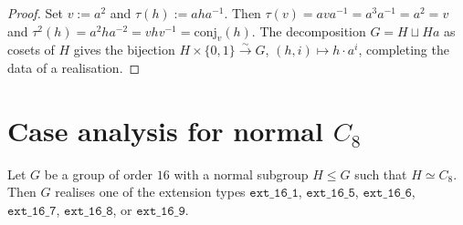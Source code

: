 \begin{proof}
  Set $v := a^2$ and $\tau(h) := aha^{-1}$. Then $\tau(v) = a v a^{-1} = a^3
  a^{-1} = a^2 = v$ and $\tau^2(h) = a^2 h a^{-2} = v h v^{-1} = \mathrm{conj}_v
  (h)$. The decomposition $G = H \sqcup Ha$ as cosets of $H$ gives the
  bijection $H \times \{0, 1\} \xrightarrow{\sim} G$,
  $(h, i) \mapsto h \cdot a^i$, completing the data of a realisation.
\end{proof}

\section{Case analysis for normal \texorpdfstring{$C_8$}{C8}}

\begin{lemma}
  \label{lem:realise-with-normal-C8}
  Let $G$ be a group of order $16$ with a normal subgroup $H \le G$ such that
  $H \simeq C_8$. Then $G$ realises one of the extension types
  $\mathtt{ext\_16\_1}$, $\mathtt{ext\_16\_5}$, $\mathtt{ext\_16\_6}$,
  $\mathtt{ext\_16\_7}$, $\mathtt{ext\_16\_8}$, or $\mathtt{ext\_16\_9}$.
\end{lemma}

